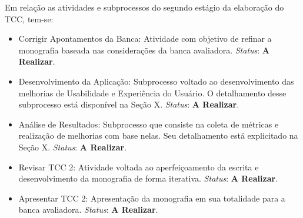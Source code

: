 Em relação as atividades e subprocessos do segundo estágio da elaboração do TCC, tem-se:

\begin{itemize}
	\item Corrigir Apontamentos da Banca: Atividade com objetivo de refinar a monografia baseada nas considerações da banca avaliadora. \textit{Status}: \textbf{A Realizar}.
	\item Desenvolvimento da Aplicação: Subprocesso voltado ao desenvolvimento das melhorias de Usabilidade e Experiência do Usuário. O detalhamento desse subprocesso está disponível na Seção X. \textit{Status}: \textbf{A Realizar}.
	\item Análise de Resultados: Subprocesso que consiste na coleta de métricas e realização de melhorias com base nelas. Seu detalhamento está explicitado na Seção X. \textit{Status}: \textbf{A Realizar}.
	\item Revisar TCC 2: Atividade voltada ao aperfeiçoamento da escrita e desenvolvimento da monografia de forma iterativa. \textit{Status}: \textbf{A Realizar}.
	\item Apresentar TCC 2: Apresentação da monografia em sua totalidade para a banca avaliadora. \textit{Status}: \textbf{A Realizar}.
\end{itemize}